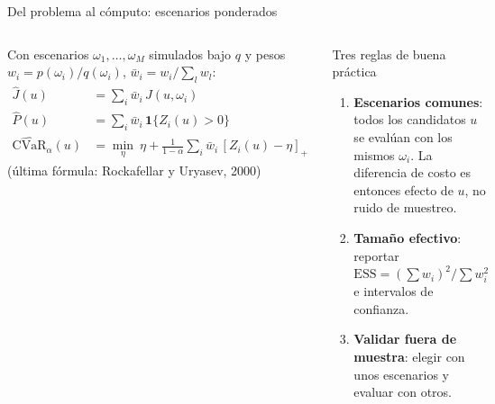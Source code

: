 \documentclass[aspectratio=169,10pt]{beamer}
\newcommand{\key}[1]{{\color{USMBlue}\bfseries #1}}
\begin{document}
\begin{frame}{Del problema al cómputo: escenarios ponderados}
\begin{columns}[T]
Con escenarios $\omega_1,\dots,\omega_M$ simulados bajo $q$ y pesos $w_i=p(\omega_i)/q(\omega_i)$, $\bar w_i=w_i/\sum_l w_l$:
\begin{align*}
\hat J(u)&=\sum_i \bar w_i\,J(u,\omega_i)\\
\hat P(u)&=\sum_i \bar w_i\,\mathbf 1\{Z_i(u)>0\}\\
\widehat{\mathrm{CVaR}}_\alpha(u)&=\min_\eta\ \eta+\tfrac{1}{1-\alpha}\sum_i\bar w_i\,[Z_i(u)-\eta]_+
\end{align*}
\small (última fórmula: Rockafellar y Uryasev, 2000)
\begin{block}{Tres reglas de buena práctica}
\begin{enumerate}\setlength{\itemsep}{.1cm}
\item \key{Escenarios comunes}: todos los candidatos $u$ se evalúan con los mismos $\omega_i$. La diferencia de costo es entonces efecto de $u$, no ruido de muestreo.
\item \key{Tamaño efectivo}: reportar $\mathrm{ESS}=(\sum w_i)^2/\sum w_i^2$ e intervalos de confianza.
\item \key{Validar fuera de muestra}: elegir con unos escenarios y evaluar con otros.
\end{enumerate}
\end{block}
\end{columns}
\end{frame}
\end{document}
